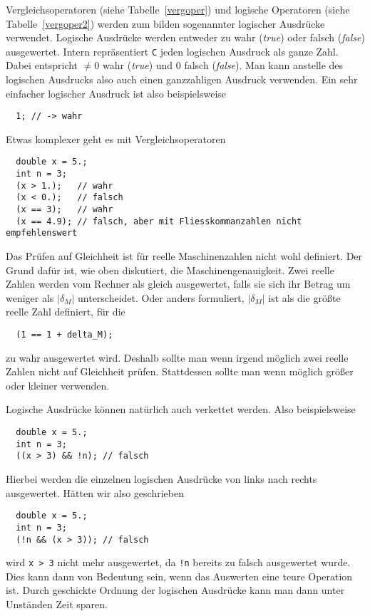Vergleichsoperatoren (siehe Tabelle~\ref{vergoper}) und logische Operatoren (siehe Tabelle~\ref{vergoper2}) werden zum bilden sogenannter logischer Ausdrücke verwendet.
Logische Ausdrücke werden entweder zu wahr (\emph{true}) oder falsch (\emph{false}) ausgewertet.
Intern repräsentiert \texttt{C} jeden logischen Ausdruck als ganze Zahl.
Dabei entspricht $\neq 0$ wahr (\emph{true}) und $0$ falsch (\emph{false}).
Man kann anstelle des logischen Ausdrucks also auch einen ganzzahligen Ausdruck verwenden.
Ein sehr einfacher logischer Ausdruck ist also beispielsweise
\begin{lstlisting}
  1; // -> wahr
\end{lstlisting}
Etwas komplexer geht es mit Vergleichsoperatoren
\begin{lstlisting}
  double x = 5.;
  int n = 3;
  (x > 1.);   // wahr
  (x < 0.);   // falsch
  (x == 3);   // wahr
  (x == 4.9); // falsch, aber mit Fliesskommanzahlen nicht empfehlenswert
\end{lstlisting}
Das Prüfen auf Gleichheit ist für reelle Maschinenzahlen nicht wohl definiert.
Der Grund dafür ist, wie oben diskutiert, die Maschinengenauigkeit.
Zwei reelle Zahlen werden vom Rechner als gleich ausgewertet, falls sie sich ihr Betrag um weniger als $|\delta_M|$ unterscheidet. 
Oder anders formuliert, $|\delta_M|$ ist als die größte reelle Zahl definiert, für die 
\begin{lstlisting}
  (1 == 1 + delta_M);
\end{lstlisting}
zu wahr ausgewertet wird.
Deshalb sollte man wenn irgend möglich zwei reelle Zahlen nicht auf Gleichheit prüfen.
Stattdessen sollte man wenn möglich größer oder kleiner verwenden.

Logische Ausdrücke können natürlich auch verkettet werden. 
Also beispielsweise
\begin{lstlisting}
  double x = 5.;
  int n = 3;
  ((x > 3) && !n); // falsch
\end{lstlisting}
Hierbei werden die einzelnen logischen Ausdrücke von links nach rechts ausgewertet. 
Hätten wir also geschrieben
\begin{lstlisting}
  double x = 5.;
  int n = 3;
  (!n && (x > 3)); // falsch
\end{lstlisting}
wird \verb|x > 3| nicht mehr ausgewertet, da \verb|!n| bereits zu falsch ausgewertet wurde.
Dies kann dann von Bedeutung sein, wenn das Auswerten eine teure Operation ist.
Durch geschickte Ordnung der logischen Ausdrücke kann man dann unter Unständen Zeit sparen.


